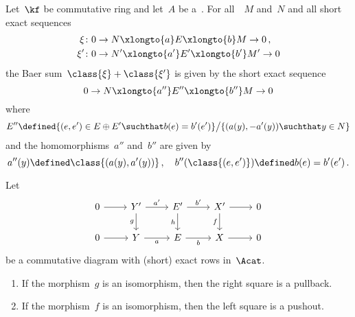 \begin{remark}
  Let~$\kf$ be commutative ring and let~$A$ be a~{\kalg}.
  For all~{}~$M$ and~$N$ and all short exact sequences
  \begin{align*}
    \xi
    &\colon
    0
    \to
    N
    \xlongto{a}
    E
    \xlongto{b}
    M
    \to
    0 \,,
    \\
    \xi'
    &\colon
    0
    \to
    N'
    \xlongto{a'}
    E'
    \xlongto{b'}
    M'
    \to
    0
  \end{align*}
  the Baer sum~$\class{\xi} + \class{\xi'}$ is given by the short exact sequence
  \[
    0
    \to
    N
    \xlongto{a''}
    E''
    \xlongto{b''}
    M
    \to
    0
  \]
  where
  \[
    E''
    \defined
    \{
      (e,e') \in E \oplus E'
    \suchthat
      b(e) = b'(e')
    \}
    \big/
    \{
      (a(y), -a'(y))
    \suchthat
      y \in N
    \}
  \]
  and the homomorphisms~$a''$ and~$b''$ are given by
  \[
    a''(y)
    \defined
    \class{ (a(y), a'(y)) } \,,
    \quad
    b''(\class{(e,e')})
    \defined
    b(e)
    = b'(e')  \,.
  \]
\end{remark}


\begin{lemma}
  \label{converse for pullback and pushout}
  Let
  \[
    \begin{tikzcd}
        0
        \arrow{r}
      & Y'
        \arrow{r}[above]{a'}
        \arrow{d}[left]{g}
      & E'
        \arrow{r}[above]{b'}
        \arrow{d}[left]{h}
      & X'
        \arrow{r}
        \arrow{d}[left]{f}
      & 0
      \\
        0
        \arrow{r}
      & Y
        \arrow{r}[below]{a}
      & E
        \arrow{r}[below]{b}
      & X
        \arrow{r}
      & 0
    \end{tikzcd}
  \]
  be a commutative diagram with (short) exact rows in~$\Acat$.
  \begin{enumerate}
    \item
      \label{right is pullback}
      If the morphism~$g$ is an isomorphism, then the right square is a pullback.
    \item
      \label{left is pushout}
      If the morphism~$f$ is an isomorphism, then the left square is a pushout.
  \end{enumerate}
\end{lemma}



